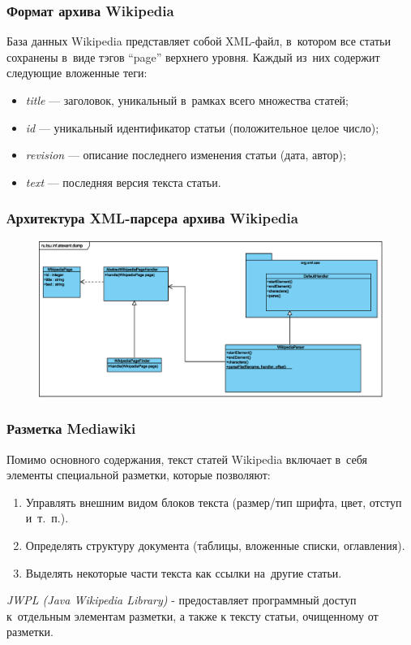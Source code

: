 \documentclass{beamer}
\begin{document}
\begin{frame}
\frametitle{Формат архива Wikipedia}
База данных Wikipedia представляет собой XML-файл, в~котором
все статьи сохранены в~виде тэгов ``page'' верхнего уровня. 
Каждый из~них содержит следующие вложенные теги:

\begin{itemize}
\item{{\it title} --- заголовок, уникальный в~рамках всего множества статей;}
\item{{\it id} --- уникальный идентификатор статьи (положительное целое число);}
\item{{\it revision} --- описание последнего изменения статьи (дата, автор);}
\item{{\it text} --- последняя версия текста статьи.}
\end{itemize}
\end{frame}

\begin{frame}
\frametitle{Архитектура XML-парсера архива Wikipedia}
\begin{figure}
\begin{center}
\includegraphics[scale=0.39]{../eps/ru.tsu.inf.atexant.dump.eps}
\end{center}
\end{figure}
\end{frame}

\begin{frame}
\frametitle{Разметка Mediawiki}

Помимо основного содержания,
текст статей Wikipedia включает в~себя элементы специальной разметки, 
которые позволяют:

\begin{enumerate}

\item{Управлять внешним видом блоков текста (размер/тип шрифта, цвет, отступ и~т.~п.).}
\item{Определять структуру документа (таблицы, вложенные списки, оглавления).}
\item{Выделять некоторые части текста как ссылки на~другие статьи.}

\end{enumerate}

{\it JWPL (Java Wikipedia Library) } - 
предоставляет программный доступ к~отдельным элементам разметки,
а также к тексту статьи, очищенному от разметки.
\end{frame}
\end{document}
